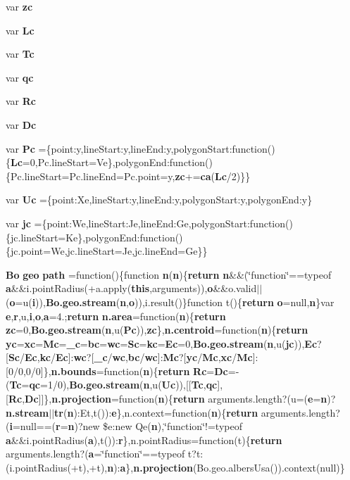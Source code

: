 \begin{DoxyCompactItemize}
\item 
var {\bf zc}
\item 
var {\bf Lc}
\item 
var {\bf Tc}
\item 
var {\bf qc}
\item 
var {\bf Rc}
\item 
var {\bf Dc}
\item 
var {\bf Pc} =\{point\+:y,line\+Start\+:y,line\+End\+:y,polygon\+Start\+:function()\{{\bf Lc}=0,Pc.\+line\+Start=Ve\},polygon\+End\+:function()\{Pc.\+line\+Start=Pc.\+line\+End=Pc.\+point=y,{\bf zc}+={\bf ca}({\bf Lc}/2)\}\}
\item 
var {\bf Uc} =\{point\+:\+Xe,line\+Start\+:y,line\+End\+:y,polygon\+Start\+:y,polygon\+End\+:y\}
\item 
var {\bf jc} =\{point\+:\+We,line\+Start\+:\+Je,line\+End\+:\+Ge,polygon\+Start\+:function()\{jc.\+line\+Start=Ke\},polygon\+End\+:function()\{jc.\+point=We,jc.\+line\+Start=Je,jc.\+line\+End=Ge\}\}
\item 
{\bf Bo} {\bf geo} {\bf path} =function()\{function {\bf n}({\bf n})\{{\bf return} {\bf n}\&\&(\char`\"{}function\char`\"{}==typeof {\bf a}\&\&i.\+point\+Radius(+a.\+apply({\bf this},arguments)),{\bf o}\&\&o.\+valid$\vert$$\vert$({\bf o}=u({\bf i})),{\bf Bo.\+geo.\+stream}({\bf n},{\bf o})),i.\+result()\}function t()\{{\bf return} {\bf o}=null,{\bf n}\}var {\bf e},{\bf r},u,{\bf i},{\bf o},{\bf a}=4.;{\bf return} {\bf n.\+area}=function({\bf n})\{{\bf return} {\bf zc}=0,{\bf Bo.\+geo.\+stream}({\bf n},u({\bf Pc})),{\bf zc}\},{\bf n.\+centroid}=function({\bf n})\{{\bf return} {\bf yc}={\bf xc}={\bf Mc}={\bf \+\_\+c}={\bf bc}={\bf wc}={\bf Sc}={\bf kc}={\bf Ec}=0,{\bf Bo.\+geo.\+stream}({\bf n},u({\bf jc})),{\bf Ec}?[{\bf Sc}/{\bf Ec},{\bf kc}/{\bf Ec}]\+:{\bf wc}?[{\bf \+\_\+c}/{\bf wc},{\bf bc}/{\bf wc}]\+:{\bf Mc}?[{\bf yc}/{\bf Mc},{\bf xc}/{\bf Mc}]\+:[0/0,0/0]\},{\bf n.\+bounds}=function({\bf n})\{{\bf return} {\bf Rc}={\bf Dc}=-\/({\bf Tc}={\bf qc}=1/0),{\bf Bo.\+geo.\+stream}({\bf n},u({\bf Uc})),[[{\bf Tc},{\bf qc}],[{\bf Rc},{\bf Dc}]]\},{\bf n.\+projection}=function({\bf n})\{{\bf return} arguments.\+length?(u=({\bf e}={\bf n})?{\bf n.\+stream}$\vert$$\vert${\bf tr}({\bf n})\+:Et,t())\+:{\bf e}\},n.\+context=function({\bf n})\{{\bf return} arguments.\+length?({\bf i}=null==({\bf r}={\bf n})?new \$e\+:new Qe({\bf n}),\char`\"{}function\char`\"{}!=typeof {\bf a}\&\&i.\+point\+Radius({\bf a}),t())\+:{\bf r}\},n.\+point\+Radius=function(t)\{{\bf return} arguments.\+length?({\bf a}=\char`\"{}function\char`\"{}==typeof t?t\+:(i.\+point\+Radius(+t),+t),{\bf n})\+:{\bf a}\},{\bf n.\+projection}(Bo.\+geo.\+albers\+Usa()).context(null)\}

\end{DoxyCompactItemize}
